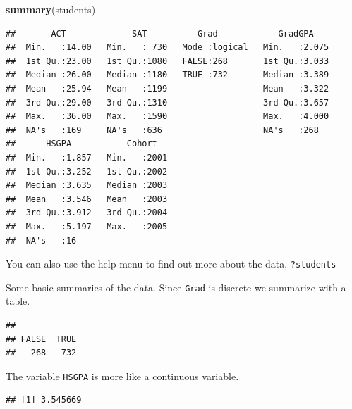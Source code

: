 \documentclass[]{book}
\newenvironment{Shaded}{\begin{snugshade}}{\end{snugshade}}
\newcommand{\KeywordTok}[1]{\textcolor[rgb]{0.13,0.29,0.53}{\textbf{#1}}}
\newcommand{\DataTypeTok}[1]{\textcolor[rgb]{0.13,0.29,0.53}{#1}}
\newcommand{\OtherTok}[1]{\textcolor[rgb]{0.56,0.35,0.01}{#1}}
\newcommand{\OperatorTok}[1]{\textcolor[rgb]{0.81,0.36,0.00}{\textbf{#1}}}
\newcommand{\NormalTok}[1]{#1}
\theoremstyle{definition}
\theoremstyle{definition}
\theoremstyle{definition}
\theoremstyle{remark}
\begin{document}
\begin{Shaded}
\begin{Highlighting}[]
\KeywordTok{summary}\NormalTok{(students)}
\end{Highlighting}
\end{Shaded}

\begin{verbatim}
##       ACT             SAT          Grad            GradGPA     
##  Min.   :14.00   Min.   : 730   Mode :logical   Min.   :2.075  
##  1st Qu.:23.00   1st Qu.:1080   FALSE:268       1st Qu.:3.033  
##  Median :26.00   Median :1180   TRUE :732       Median :3.389  
##  Mean   :25.94   Mean   :1199                   Mean   :3.322  
##  3rd Qu.:29.00   3rd Qu.:1310                   3rd Qu.:3.657  
##  Max.   :36.00   Max.   :1590                   Max.   :4.000  
##  NA's   :169     NA's   :636                    NA's   :268    
##      HSGPA           Cohort    
##  Min.   :1.857   Min.   :2001  
##  1st Qu.:3.252   1st Qu.:2002  
##  Median :3.635   Median :2003  
##  Mean   :3.546   Mean   :2003  
##  3rd Qu.:3.912   3rd Qu.:2004  
##  Max.   :5.197   Max.   :2005  
##  NA's   :16
\end{verbatim}

You can also use the help menu to find out more about the data,
\texttt{?students}

Some basic summaries of the data. Since \texttt{Grad} is discrete we
summarize with a table.

\begin{Shaded}
\end{Shaded}

\begin{verbatim}
## 
## FALSE  TRUE 
##   268   732
\end{verbatim}

The variable \texttt{HSGPA} is more like a continuous variable.

\begin{Shaded}
\end{Shaded}

\begin{verbatim}
## [1] 3.545669
\end{verbatim}
\end{document}
